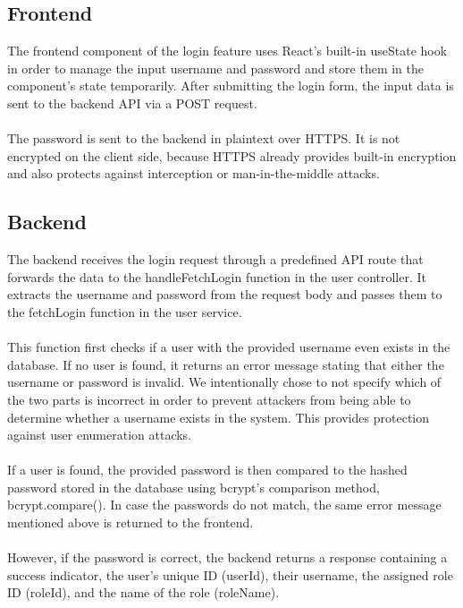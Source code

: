 \documentclass[a4paper,12pt]{report}
\begin{document}
\subsection{Frontend}
The frontend component of the login feature uses React's built-in useState hook in order to manage the input username and password and store them in the component's state temporarily. After submitting the login form, the input data is sent to the backend API via a POST request.\\\\
The password is sent to the backend in plaintext over HTTPS. It is not encrypted on the client side, because HTTPS already provides built-in encryption and also protects against interception or man-in-the-middle attacks.
\subsection{Backend}
The backend receives the login request through a predefined API route that forwards the data to the handleFetchLogin function in the user controller. It extracts the username and password from the request body and passes them to the fetchLogin function in the user service.\\\\
This function first checks if a user with the provided username even exists in the database. If no user is found, it returns an error message stating that either the username or password is invalid. We intentionally chose to not specify which of the two parts is incorrect in order to prevent attackers from being able to determine whether a username exists in the system. This provides protection against user enumeration attacks.\\\\
If a user is found, the provided password is then compared to the hashed password stored in the database using bcrypt's comparison method, bcrypt.compare(). In case the passwords do not match, the same error message mentioned above is returned to the frontend.\\\\
However, if the password is correct, the backend returns a response containing a success indicator, the user's unique ID (userId), their username, the assigned role ID (roleId), and the name of the role (roleName).
\end{document}
